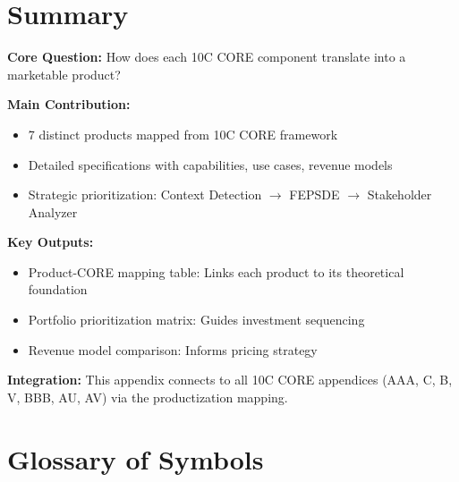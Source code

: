 
\section{Summary}
\label{sec:vvv3-summary}

\begin{tcolorbox}[colback=green!10!white, colframe=green!75!black,
    title=\textbf{Appendix UNMAPPED_VVV.3: Summary}]

\textbf{Core Question:} How does each 10C CORE component translate into a marketable product?

\textbf{Main Contribution:}
\begin{itemize}[nosep]
    \item 7 distinct products mapped from 10C CORE framework
    \item Detailed specifications with capabilities, use cases, revenue models
    \item Strategic prioritization: Context Detection $\to$ FEPSDE $\to$ Stakeholder Analyzer
\end{itemize}

\textbf{Key Outputs:}
\begin{itemize}[nosep]
    \item Product-CORE mapping table: Links each product to its theoretical foundation
    \item Portfolio prioritization matrix: Guides investment sequencing
    \item Revenue model comparison: Informs pricing strategy
\end{itemize}

\textbf{Integration:} This appendix connects to all 10C CORE appendices (AAA, C, B, V, BBB, AU, AV) via the productization mapping.

\end{tcolorbox}


\section{Glossary of Symbols}
\label{sec:vvv3-glossary}

